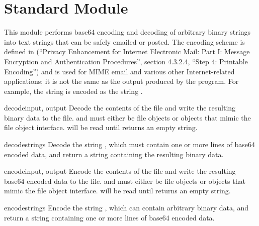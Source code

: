 \section{Standard Module }
\label{module-base64}

This module performs base64 encoding and decoding of arbitrary binary
strings into text strings that can be safely emailed or posted.  The
encoding scheme is defined in  (``Privacy Enhancement for
Internet Electronic Mail: Part I: Message Encryption and
Authentication Procedures'', section 4.3.2.4, ``Step 4: Printable
Encoding'') and is used for MIME email and
various other Internet-related applications; it is not the same as the
output produced by the  program.  For example, the
string  is encoded as the string
.  


\begin{funcdesc}{decode}{input, output}
Decode the contents of the  file and write the resulting
binary data to the  file.
 and  must either be file objects or objects that
mimic the file object interface.  will be read until
 returns an empty string.
\end{funcdesc}

\begin{funcdesc}{decodestring}{s}
Decode the string , which must contain one or more lines of
base64 encoded data, and return a string containing the resulting
binary data.
\end{funcdesc}

\begin{funcdesc}{encode}{input, output}
Encode the contents of the  file and write the resulting
base64 encoded data to the  file.
 and  must either be file objects or objects that
mimic the file object interface.  will be read until
 returns an empty string.
\end{funcdesc}

\begin{funcdesc}{encodestring}{s}
Encode the string , which can contain arbitrary binary data,
and return a string containing one or more lines of
base64 encoded data.
\end{funcdesc}
